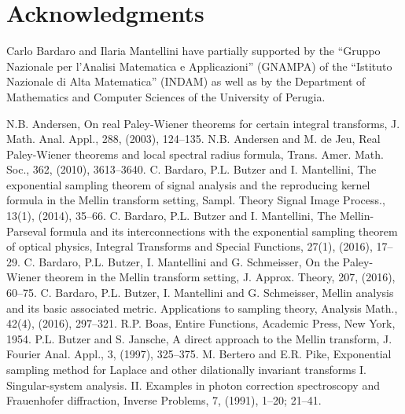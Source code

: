 \documentclass[amsmath,english,a4paper,graphicx,12pt]{article}
\begin{document}
  
      




\section{Acknowledgments}
Carlo Bardaro and Ilaria Mantellini have partially supported by the ``Gruppo Nazionale per l'Analisi Matematica e Applicazioni'' (GNAMPA) of the 
``Istituto Nazionale di Alta Matematica'' (INDAM) as well as by the Department of Mathematics and Computer Sciences of the University of Perugia. 



\begin{thebibliography}{99}
\small
{} N.B. Andersen, On real Paley-Wiener theorems for certain integral transforms, J. Math. Anal. Appl., 288, (2003), 124--135.
 N.B. Andersen and M. de Jeu, Real Paley-Wiener theorems and local spectral radius formula, Trans. Amer. Math. Soc., 362,
(2010), 3613--3640.
 C. Bardaro, P.L. Butzer and I. Mantellini, The exponential sampling theorem of signal analysis and the reproducing kernel formula in the 
Mellin transform setting, Sampl. Theory Signal Image Process., 13(1), (2014), 35--66.
 C. Bardaro, P.L. Butzer and I. Mantellini, The Mellin-Parseval formula and its interconnections with the exponential sampling theorem of 
optical physics, Integral Transforms and Special Functions, 27(1), (2016), 17--29.
 C. Bardaro, P.L. Butzer, I. Mantellini and G. Schmeisser, On the Paley-Wiener theorem in the Mellin transform setting, 
J. Approx. Theory, 207, (2016), 60--75.
 C. Bardaro, P.L. Butzer, I. Mantellini and G. Schmeisser, Mellin analysis and its basic associated metric. Applications to sampling theory, 
Analysis Math., 42(4), (2016), 297--321.
 R.P. Boas, Entire Functions, Academic Press, New York, 1954.
 P.L. Butzer and S. Jansche,  A direct approach to the Mellin transform, J. Fourier Anal. Appl., 
3, (1997), 325--375.
 M. Bertero and E.R. Pike, Exponential sampling method for Laplace and other dilationally invariant transforms I. Singular-system analysis. II. 
Examples in photon correction spectroscopy and Frauenhofer diffraction, Inverse Problems, 7, (1991), 1--20; 21--41.

\end{thebibliography}
\end{document}
